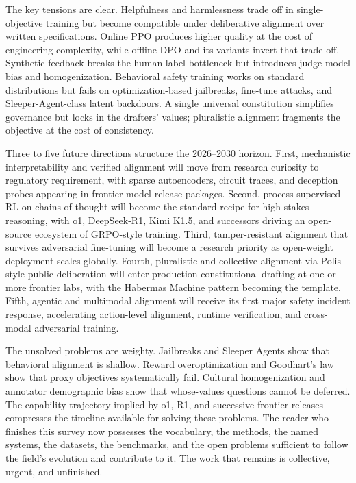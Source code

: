 The key tensions are clear. Helpfulness and harmlessness trade off in single-objective training but become compatible under deliberative alignment over written specifications. Online PPO produces higher quality at the cost of engineering complexity, while offline DPO and its variants invert that trade-off. Synthetic feedback breaks the human-label bottleneck but introduces judge-model bias and homogenization. Behavioral safety training works on standard distributions but fails on optimization-based jailbreaks, fine-tune attacks, and Sleeper-Agent-class latent backdoors. A single universal constitution simplifies governance but locks in the drafters' values; pluralistic alignment fragments the objective at the cost of consistency.

Three to five future directions structure the 2026--2030 horizon. First, mechanistic interpretability and verified alignment will move from research curiosity to regulatory requirement, with sparse autoencoders, circuit traces, and deception probes appearing in frontier model release packages. Second, process-supervised RL on chains of thought will become the standard recipe for high-stakes reasoning, with o1, DeepSeek-R1, Kimi K1.5, and successors driving an open-source ecosystem of GRPO-style training. Third, tamper-resistant alignment that survives adversarial fine-tuning will become a research priority as open-weight deployment scales globally. Fourth, pluralistic and collective alignment via Polis-style public deliberation will enter production constitutional drafting at one or more frontier labs, with the Habermas Machine pattern becoming the template. Fifth, agentic and multimodal alignment will receive its first major safety incident response, accelerating action-level alignment, runtime verification, and cross-modal adversarial training.

The unsolved problems are weighty. Jailbreaks and Sleeper Agents show that behavioral alignment is shallow. Reward overoptimization and Goodhart's law show that proxy objectives systematically fail. Cultural homogenization and annotator demographic bias show that whose-values questions cannot be deferred. The capability trajectory implied by o1, R1, and successive frontier releases compresses the timeline available for solving these problems. The reader who finishes this survey now possesses the vocabulary, the methods, the named systems, the datasets, the benchmarks, and the open problems sufficient to follow the field's evolution and contribute to it. The work that remains is collective, urgent, and unfinished.

